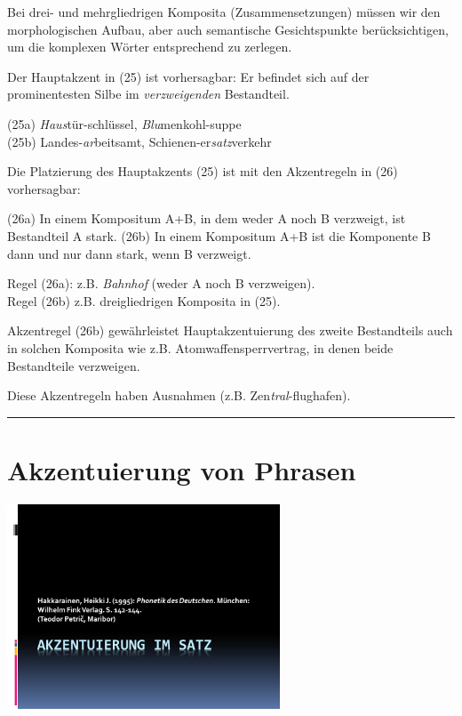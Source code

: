 \documentclass[
  letterpaper,
]{scrbook}
\begin{document}
Bei drei- und mehrgliedrigen Komposita (Zusammensetzungen) müssen wir
den morphologischen Aufbau, aber auch semantische Gesichtspunkte
berücksichtigen, um die komplexen Wörter entsprechend zu zerlegen.

Der Hauptakzent in (25) ist vorhersagbar: Er befindet sich auf der
prominentesten Silbe im \emph{verzweigenden} Bestandteil.

(25a) \emph{Haus}tür-schlüssel, \emph{Blu}menkohl-suppe\\
(25b) Landes-\emph{ar}beitsamt, Schienen-er\emph{satz}verkehr

Die Platzierung des Hauptakzents (25) ist mit den Akzentregeln in (26)
vorhersagbar:

(26a) In einem Kompositum A+B, in dem weder A noch B verzweigt, ist
Bestandteil A stark. (26b) In einem Kompositum A+B ist die Komponente B
dann und nur dann stark, wenn B verzweigt.

Regel (26a): z.B. \emph{Bahnhof} (weder A noch B verzweigen).\\
Regel (26b) z.B. dreigliedrigen Komposita in (25).

Akzentregel (26b) gewährleistet Hauptakzentuierung des zweite
Bestandteils auch in solchen Komposita wie z.B. Atomwaffensperrvertrag,
in denen beide Bestandteile verzweigen.

Diese Akzentregeln haben Ausnahmen (z.B. Zen\emph{tral}-flughafen).

\begin{center}\rule{0.5\linewidth}{0.5pt}\end{center}

\hypertarget{akzentuierung-von-phrasen}{%
\section{Akzentuierung von Phrasen}\label{akzentuierung-von-phrasen}}

\includegraphics[width=3.2in,height=\textheight]{./pictures/satzakzentuierung/satzakzent_Diapozitiv1.PNG}
\end{document}
